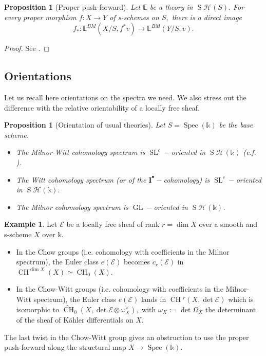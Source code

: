 \documentclass{amsart}
\theoremstyle{plain}%
\newtheorem{prop}[subsubsection]{Proposition}
\theoremstyle{remark}
\theoremstyle{definition}
\newtheorem{example}[subsubsection]{Example}
\newcommand{\cE}{\mathcal{E}}
\newcommand{\cH}{\mathcal{H}}
\newcommand{\eE}{\mathbb{E}}
\newcommand{\ek}{\mathbb{k}}
\newcommand{\fId}{{\mathbf{I}}}
\newcommand{\Chowtilde}[2][]{\widetilde{\operatorname{CH}}{}^{#1}\!\left(#2\right)}
\newcommand{\Chowtildecov}[2][]{\widetilde{\operatorname{CH}}_{#1}\left(#2\right)}
\newcommand{\StableHo}[2][]{\operatorname{S}\!\cH^{#1}\!\left(#2\right)}
\newcommand{\SL}{\operatorname{SL}}
\newcommand{\Gl}{\operatorname{GL}}
\newcommand{\Spec}[1]{\operatorname{Spec}\left(#1\right)}
\newcommand{\Chowct}[2][]{\operatorname{CH}^{#1}\!\left( #2 \right)}
\newcommand{\Chowcov}[2][]{\operatorname{CH}_{#1}\!\left( #2 \right)}
\begin{document}
\begin{prop}[Proper push-forward]\label{PROP - covariance propre}
Let $\eE$ be a theory in $\StableHo{S}.$ For every proper morphism $f : X \to Y$ of s-schemes on $S,$ there is a direct image 
\[f_\ast : \eE^{BM}(X/S,f^\ast v) \to \eE^{BM}(Y/S,v).\]
\end{prop}

\begin{proof}
See \cite[Proposition 2.3.4]{Cha_dP2-4}.
\end{proof}
\subsection{Orientations}\label{SSEC - orientations}
Let us recall here orientations on the spectra we need. We also stress out the difference with the relative orientability of a locally free sheaf.


\begin{prop}[Orientation of usual theories]
Let $S = \Spec{\ek}$ be the base scheme.
\begin{itemize}
    \item The Milnor-Witt cohomology spectrum is $\SL^c-$oriented in $\StableHo{\ek}$ (c.f. \cite[Remark 5.5]{Ananyevskiy_SLoriented}).
    \item The Witt cohomology spectrum (or of the $\fId^\bullet-$cohomology) is $\SL^c-$oriented in $\StableHo{\ek}$.
    \item The Milnor cohomology spectrum is $\Gl-$oriented in $\StableHo{\ek}$.
\end{itemize}
\end{prop}



\begin{example}
Let $\cE$ be a locally free sheaf of rank $r = \dim X$ over a smooth and s-scheme $X$ over $\ek$.
\begin{itemize}
    \item In the Chow groups (i.e. cohomology with coefficients in the Milnor spectrum), the Euler class $e(\cE)$ becomes $c_r(\cE)$ in $\Chowct[\dim X]{X} \simeq \Chowcov[0]{X}.$
    \item In the Chow-Witt groups (i.e. cohomology with coefficients in the Milnor-Witt spectrum), the Euler class $e(\cE)$ lands in $\Chowtilde[r]{X,\det \cE}$ which is isomorphic to $\Chowtildecov[0]{X,\det \cE \otimes \omega_X^\vee},$ with $\omega_X := \det \Omega_X$ the determinant of the sheaf of Kähler differentials on $X.$
\end{itemize}
\end{example}
The last twist in the Chow-Witt group gives an obstruction to use the proper push-forward along the structural map $X \to \Spec{\ek}.$
\end{document}
